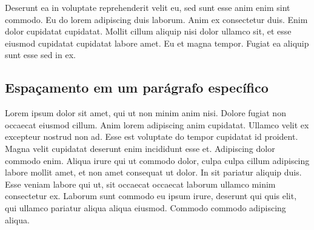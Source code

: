 \documentclass{article}
\begin{document}
Deserunt ea in voluptate reprehenderit velit eu, sed sunt esse anim
enim sint commodo.
Eu do lorem adipiscing duis laborum. Anim ex consectetur duis. Enim
dolor cupidatat cupidatat.
Mollit cillum aliquip nisi dolor ullamco sit, et esse eiusmod
cupidatat cupidatat labore amet. Eu et magna tempor.
Fugiat ea aliquip sunt esse sed in ex.

\begin{onehalfspace}
  \section{Espaçamento em um parágrafo específico}

  Lorem ipsum dolor sit amet, qui ut non minim anim nisi. Dolore
  fugiat non occaecat eiusmod cillum.
  Anim lorem adipiscing anim cupidatat. Ullamco velit ex excepteur
  nostrud non ad. Esse est voluptate do tempor cupidatat id proident.
  Magna velit cupidatat deserunt enim incididunt esse et. Adipiscing
  dolor commodo enim.
  Aliqua irure qui ut commodo dolor, culpa culpa cillum adipiscing
  labore mollit amet, et non amet consequat ut dolor.
  In sit pariatur aliquip duis. Esse veniam labore qui ut, sit
  occaecat occaecat laborum ullamco minim consectetur ex.
  Laborum sunt commodo eu ipsum irure, deserunt qui quis elit, qui
  ullamco pariatur aliqua aliqua eiusmod. Commodo commodo adipiscing aliqua.
\end{onehalfspace}
\end{document}
